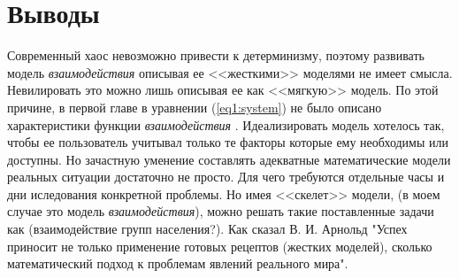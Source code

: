 \chapter{Выводы}

Современный хаос невозможно привести к детерминизму, поэтому развивать модель \textit{взаимодействия} описывая ее <<жесткими>>\cite{Arnold} моделями не имеет смысла. Невилировать это можно лишь описывая ее как <<мягкую>> модель. По этой причине, в первой главе в уравнении (\ref{eq1:system}) не было описано характеристики функции \textit{взаимодействия} . Идеализировать модель хотелось так, чтобы ее пользователь учитывал только те факторы которые ему необходимы или доступны. Но зачастную уменение составлять адекватные математические модели реальных ситуации достаточно не просто. Для чего требуются отдельные часы и дни иследования конкретной проблемы. Но имея <<скелет>> модели, (в моем случае это модель \textit{взаимодействия}), можно решать такие поставленные задачи как (взаимодействие групп населения?). Как сказал В. И. Арнольд  "Успех приносит не только применение готовых рецептов (жестких моделей), сколько математический подход к проблемам явлений реального мира".